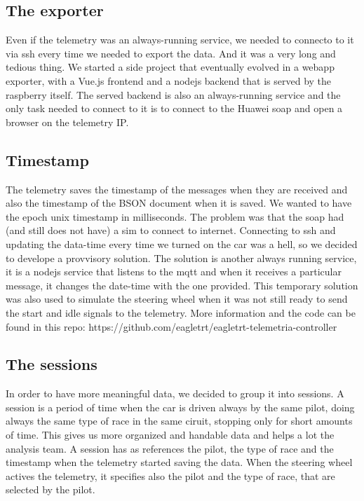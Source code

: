 \subsection{The exporter}

Even if the telemetry was an always-running service, we needed to connecto to it via ssh every time we needed to export the data. And it was a 
very long and tedious thing. We started a side project that eventually evolved in a webapp exporter, with a Vue.js frontend and a nodejs backend
that is served by the raspberry itself. The served backend is also an always-running service and the only task needed to connect to it is to 
connect to the Huawei soap and open a browser on the telemetry IP.

\subsection{Timestamp}

The telemetry saves the timestamp of the messages when they are received and also the timestamp of the BSON document when it is saved. We wanted
to have the epoch unix timestamp in milliseconds. The problem was that the soap had (and still does not have) a sim to connect to internet.
Connecting to ssh and updating the data-time every time we turned on the car was a hell, so we decided to develope a provvisory solution.
The solution is another always running service, it is a nodejs service that listens to the mqtt and when it receives a particular message,
it changes the date-time with the one provided. This temporary solution was also used to simulate the steering wheel when it was not still ready
to send the start and idle signals to the telemetry. More information and the code can be found in this repo: https://github.com/eagletrt/eagletrt-telemetria-controller

\subsection{The sessions}

In order to have more meaningful data, we decided to group it into sessions. A session is a period of time when the car is driven always by the
same pilot, doing always the same type of race in the same ciruit, stopping only for short amounts of time. This gives us more organized and
handable data and helps a lot the analysis team. A session has as references the pilot, the type of race and the timestamp when the telemetry
started saving the data. When the steering wheel actives the telemetry, it specifies also the pilot and the type of race, that are selected by
the pilot.

